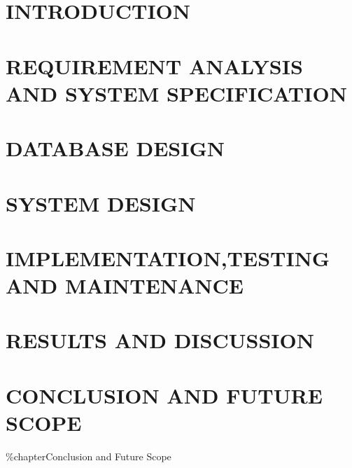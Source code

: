 \documentclass[12pt]{report}
\begin{document}

\begin{screen}
\ppttitle
\end{screen}
\footskip 0.7cm
\thispagestyle{empty} 
\pagetitle
\newpage
{}
\cfoot{\thepage}


%


\newpage

\newpage
\tableofcontents
\newpage
\listoffigures
\newpage
\listoftables
\newpage

\cfoot{\thepage}

\newpage


\chapter{INTRODUCTION}

\newpage
\chapter{REQUIREMENT ANALYSIS AND SYSTEM SPECIFICATION}

\chapter{DATABASE DESIGN}

\chapter{SYSTEM DESIGN}

\chapter{IMPLEMENTATION,TESTING AND MAINTENANCE}

\chapter{RESULTS AND DISCUSSION}

\chapter{CONCLUSION AND FUTURE SCOPE}

\%chapter{Conclusion and Future Scope}
%

\end{document}
